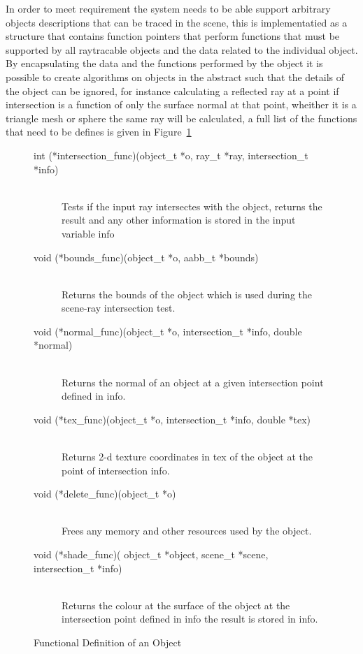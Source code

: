 In order to meet requirement  the system needs to be able support arbitrary objects descriptions
that can be traced in the scene, this is implementatied as a structure that contains function pointers that perform functions
that must be supported by all raytracable objects and the data related to the individual object.
By encapsulating the data and the functions performed by the object it is possible to create algorithms on objects in the
abstract such that the details of the object can be ignored, for instance calculating a reflected ray at a point if intersection
is a function of only the surface normal at that point, wheither it is a triangle mesh or sphere the same ray will be calculated,
a full list of the functions that need to be defines is given in Figure~\ref{fig:object_funcs}

\begin{figure}[h]
\begin{description}
\item[int  (*intersection\_func)(object\_t *o, ray\_t *ray, intersection\_t *info)] \hfill \\
	Tests if the input ray intersectes with the object, returns the result and any other information is stored in the input variable info
\item[void (*bounds\_func)(object\_t *o, aabb\_t *bounds)] \hfill \\
	Returns the bounds of the object which is used during the scene-ray intersection test.
\item[void (*normal\_func)(object\_t *o, intersection\_t *info, double *normal)] \hfill \\
	Returns the normal of an object at a given intersection point defined in info.
\item[void (*tex\_func)(object\_t *o, intersection\_t *info, double *tex)] \hfill \\
	Returns 2-d texture coordinates in tex of the object at the point of intersection info.
\item[void (*delete\_func)(object\_t *o)] \hfill \\
	Frees any memory and other resources used by the object.
\item[void (*shade\_func)( object\_t *object, scene\_t *scene, intersection\_t *info)] \hfill \\
	Returns the colour at the surface of the object at the intersection point defined in info the result is stored in info.
\end{description}
\label{fig:object_funcs}
\caption{Functional Definition of an Object}
\end{figure}


